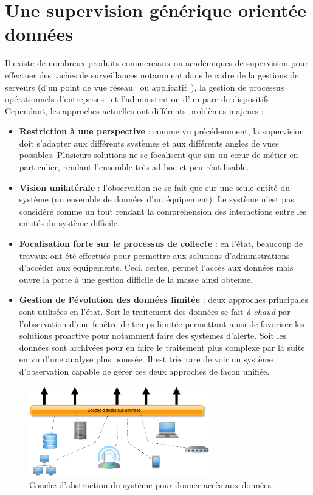 \section{Une supervision générique orientée données}\label{sec:intro:objectif}
Il existe de nombreux produits commerciaux ou académiques de supervision pour effectuer des taches de surveillances notamment dans le cadre de la gestions de serveurs (d'un point de vue réseau~\cite{gestionequipreseau} ou applicatif~\cite{supervisionapache}), la gestion de processus opérationnels d'entreprises~\cite{google:businessprocesssupervision} et l'administration d'un parc de dispositifs~\cite{snmp:thesemehdi}. Cependant, les approches actuelles ont différents problèmes majeurs :
\begin{itemize}
    \item \textbf{Restriction à une perspective} : comme vu précédemment, la supervision doit s'adapter aux différents systèmes et aux différents angles de vues possibles. Plusieurs solutions ne se focalisent que sur un cœur de métier en particulier, rendant l'ensemble très ad-hoc et peu réutilisable.
    \item \textbf{Vision unilatérale} : l'observation ne se fait que sur une seule entité du système (un ensemble de données d'un équipement). Le système n'est pas considéré comme un tout rendant la compréhension des interactions entre les entités du système difficile.
    \item \textbf{Focalisation forte sur le processus de collecte} : en l'état, beaucoup de travaux ont été effectués pour permettre aux solutions d'administrations d'accéder aux équipements. Ceci, certes, permet l'accès aux données mais ouvre la porte à une gestion difficile de la masse ainsi obtenue.
    \item \textbf{Gestion de l'évolution des données limitée} : deux approches principales sont utilisées en l'état. Soit le traitement des données se fait \textit{à chaud} par l'observation d'une fenêtre de temps limitée permettant ainsi de favoriser les solutions proactive pour notamment faire des systèmes d'alerte. Soit les données sont archivées pour en faire le traitement plus complexe par la suite en vu d'une analyse plus poussée. Il est très rare de voir un système d'observation capable de gérer ces deux approches de façon unifiée. 
\end{itemize}

\begin{figure}
\centering
\includegraphics[width=0.7\textwidth]{fig/intro-objectif.eps}
\caption{Couche d'abstraction du système pour donner accès aux données}\label{fig:intro:objectif:abstraction}
\end{figure}

